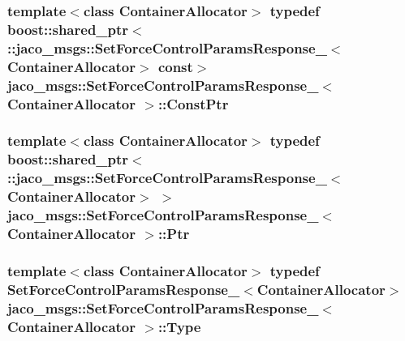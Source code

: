 \subsubsection[{\texorpdfstring{Const\+Ptr}{ConstPtr}}]{\setlength{\rightskip}{0pt plus 5cm}template$<$class Container\+Allocator$>$ typedef boost\+::shared\+\_\+ptr$<$ \+::{\bf jaco\+\_\+msgs\+::\+Set\+Force\+Control\+Params\+Response\+\_\+}$<$Container\+Allocator$>$ const$>$ {\bf jaco\+\_\+msgs\+::\+Set\+Force\+Control\+Params\+Response\+\_\+}$<$ Container\+Allocator $>$\+::{\bf Const\+Ptr}}\hypertarget{structjaco__msgs_1_1SetForceControlParamsResponse___a1be8572b7aa81f0d904c12eb1e203a74}{}\label{structjaco__msgs_1_1SetForceControlParamsResponse___a1be8572b7aa81f0d904c12eb1e203a74}
\subsubsection[{\texorpdfstring{Ptr}{Ptr}}]{\setlength{\rightskip}{0pt plus 5cm}template$<$class Container\+Allocator$>$ typedef boost\+::shared\+\_\+ptr$<$ \+::{\bf jaco\+\_\+msgs\+::\+Set\+Force\+Control\+Params\+Response\+\_\+}$<$Container\+Allocator$>$ $>$ {\bf jaco\+\_\+msgs\+::\+Set\+Force\+Control\+Params\+Response\+\_\+}$<$ Container\+Allocator $>$\+::{\bf Ptr}}\hypertarget{structjaco__msgs_1_1SetForceControlParamsResponse___a80a1f49c09c1d0ffccf753dbade78922}{}\label{structjaco__msgs_1_1SetForceControlParamsResponse___a80a1f49c09c1d0ffccf753dbade78922}
\subsubsection[{\texorpdfstring{Type}{Type}}]{\setlength{\rightskip}{0pt plus 5cm}template$<$class Container\+Allocator$>$ typedef {\bf Set\+Force\+Control\+Params\+Response\+\_\+}$<$Container\+Allocator$>$ {\bf jaco\+\_\+msgs\+::\+Set\+Force\+Control\+Params\+Response\+\_\+}$<$ Container\+Allocator $>$\+::{\bf Type}}\hypertarget{structjaco__msgs_1_1SetForceControlParamsResponse___a4925175e5a6228261ad680833a4f14a4}{}\label{structjaco__msgs_1_1SetForceControlParamsResponse___a4925175e5a6228261ad680833a4f14a4}


